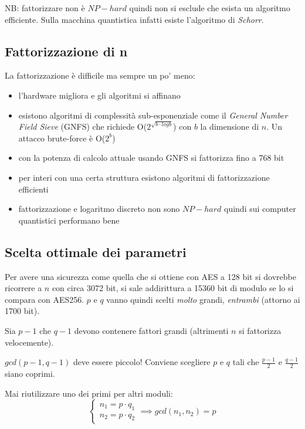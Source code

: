 NB: fattorizzare non è $NP-hard$ quindi non si esclude che esista un algoritmo efficiente. Sulla macchina quantistica infatti esiste l'algoritmo di \emph{Schorr}.

\clearpage

\subsection{Fattorizzazione di n}
La fattorizzazione è difficile ma sempre un po' meno:
\begin{itemize}
    \item l'hardware migliora e gli algoritmi si affinano
    \item esistono algoritmi di complessità sub-esponenziale come il \emph{General Number Field Sieve} (GNFS) che richiede O($2^{\sqrt{b \cdot log b}}$) con $b$ la dimensione di $n$. Un attacco brute-force è O($2^b$)
    \item con la potenza di calcolo attuale usando GNFS si fattorizza fino a 768 bit
    \item per interi con una certa struttura esistono algoritmi di fattorizzazione efficienti
    \item fattorizzazione e logaritmo discreto non sono $NP-hard$ quindi sui computer quantistici performano bene
\end{itemize}

\subsection{Scelta ottimale dei parametri}
Per avere una sicurezza come quella che si ottiene con AES a 128 bit si dovrebbe ricorrere a $n$ con circa 3072 bit, si sale addirittura a 15360 bit di modulo se lo si compara con AES256.
$p$ e $q$ vanno quindi scelti \emph{molto} grandi, \emph{entrambi} (attorno ai 1700 bit).

Sia $p-1$ che $q-1$ devono contenere fattori grandi (altrimenti $n$ si fattorizza velocemente).

$gcd(p-1, q-1)$ deve essere piccolo! Conviene scegliere $p$ e $q$ tali che $\frac{p-1}{2}$ e $\frac{q-1}{2}$ siano coprimi.

Mai riutilizzare uno dei primi per altri moduli:
\begin{equation}
    \begin{cases}
    n_1 = p \cdot q_1 \\
    n_2 = p \cdot q_2
    \end{cases}
    \implies gcd(n_1, n_2) = p
\end{equation}

